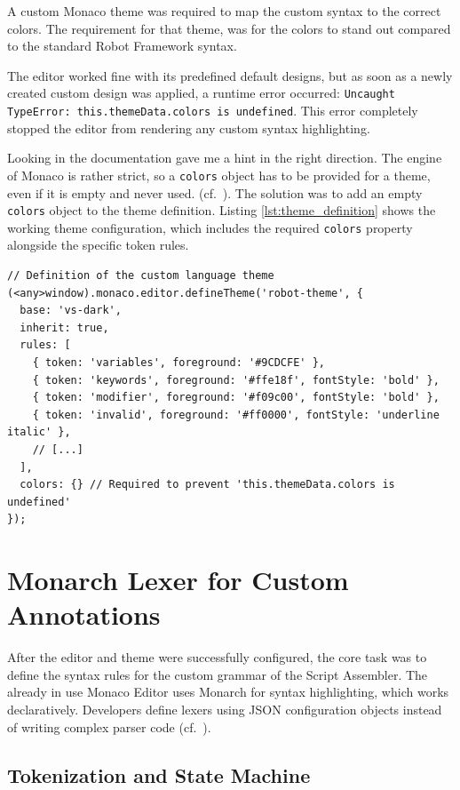 A custom Monaco theme was required to map the custom syntax to the correct colors. The requirement for that theme, was for the colors to stand out compared to the standard Robot Framework syntax.

The editor worked fine with its predefined default designs, but as soon as a newly created custom design was applied, a runtime error occurred: \texttt{Uncaught TypeError: this.themeData.colors is undefined}. This error completely stopped the editor from rendering any custom syntax highlighting.

Looking in the documentation gave me a hint in the right direction. The engine of Monaco is rather strict, so a \texttt{colors} object has to be provided for a theme, even if it is empty and never used.
(cf.~\cite{MonacoThemeColorsAPI}). The solution was to add an empty \texttt{colors} object to the theme definition. Listing \ref{lst:theme_definition} shows the working theme configuration, which includes the required \texttt{colors} property alongside the specific token rules.

\begin{lstlisting}[caption={Custom monaco theme including the required color object}, label={lst:theme_definition}]
// Definition of the custom language theme
(<any>window).monaco.editor.defineTheme('robot-theme', {
  base: 'vs-dark',
  inherit: true,
  rules: [
    { token: 'variables', foreground: '#9CDCFE' },
    { token: 'keywords', foreground: '#ffe18f', fontStyle: 'bold' },
    { token: 'modifier', foreground: '#f09c00', fontStyle: 'bold' },
    { token: 'invalid', foreground: '#ff0000', fontStyle: 'underline italic' },
    // [...]
  ],
  colors: {} // Required to prevent 'this.themeData.colors is undefined'
});
\end{lstlisting}

\section{Monarch Lexer for Custom Annotations}

After the editor and theme were successfully configured, the core task was to define the syntax rules for the custom grammar of the Script Assembler. The already in use Monaco Editor uses Monarch for syntax highlighting, which works declaratively. Developers define lexers using JSON configuration objects instead of writing complex parser code (cf.~\cite{MonacoMonarchDocs}).

\subsection{Tokenization and State Machine}

